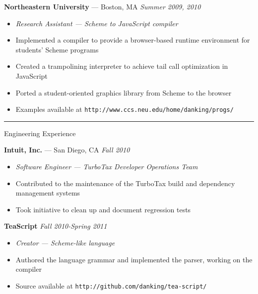 \documentclass[10pt]{letter}
\begin{document}
\begin{tabbing}
{\large \bf Northeastern University} --- Boston, MA \` \textit{Summer 2009, 2010}

\end{tabbing}
\begin{itemize}
\setlength\itemsep{1pt}
\item [] \textit{Research Assistant --- Scheme to JavaScript compiler}
\item Implemented a compiler to provide a browser-based runtime environment for students' Scheme programs
\item Created a trampolining interpreter to achieve tail call optimization in JavaScript
\item Ported a student-oriented graphics library from Scheme to the browser
\item Examples available at \texttt{http://www.ccs.neu.edu/home/danking/progs/}
\end{itemize}

\rule{\linewidth}{.5pt}

{\Large Engineering Experience}

\begin{tabbing}
{\large \bf Intuit, Inc.} --- San Diego, CA \` \textit{Fall 2010}

\end{tabbing}

\begin{itemize}
\setlength\itemsep{1pt}
\item [] \textit{Software Engineer --- TurboTax Developer Operations Team}
\item Contributed to the maintenance of the TurboTax build and dependency management systems
\item Took initiative to clean up and document regression tests
\end{itemize}


\begin{tabbing}
{\large \bf TeaScript} \` \textit{Fall 2010-Spring 2011}
\end{tabbing}

\begin{itemize}
\setlength\itemsep{1pt}
\item [] \textit{Creator --- Scheme-like language}
\item Authored the language grammar and implemented the parser, working on the compiler
\item Source available at \texttt{http://github.com/danking/tea-script/}
\end{itemize}
\end{document}
